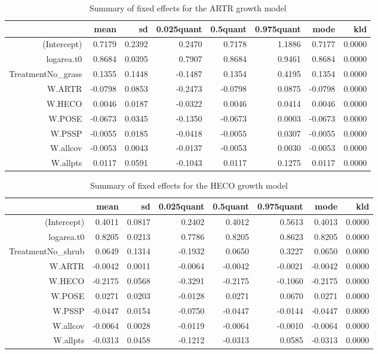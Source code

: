 \begin{table}[ht]
\centering
\caption{Summary of fixed effects for the ARTR growth model} 
\label{ARTRgrowth}
\begin{tabular}{rrrrrrrr}
  \hline
 & mean & sd & 0.025quant & 0.5quant & 0.975quant & mode & kld \\ 
  \hline
(Intercept) & 0.7179 & 0.2392 & 0.2470 & 0.7178 & 1.1886 & 0.7177 & 0.0000 \\ 
  logarea.t0 & 0.8684 & 0.0395 & 0.7907 & 0.8684 & 0.9461 & 0.8684 & 0.0000 \\ 
  TreatmentNo\_grass & 0.1355 & 0.1448 & -0.1487 & 0.1354 & 0.4195 & 0.1354 & 0.0000 \\ 
  W.ARTR & -0.0798 & 0.0853 & -0.2473 & -0.0798 & 0.0875 & -0.0798 & 0.0000 \\ 
  W.HECO & 0.0046 & 0.0187 & -0.0322 & 0.0046 & 0.0414 & 0.0046 & 0.0000 \\ 
  W.POSE & -0.0673 & 0.0345 & -0.1350 & -0.0673 & 0.0003 & -0.0673 & 0.0000 \\ 
  W.PSSP & -0.0055 & 0.0185 & -0.0418 & -0.0055 & 0.0307 & -0.0055 & 0.0000 \\ 
  W.allcov & -0.0053 & 0.0043 & -0.0137 & -0.0053 & 0.0030 & -0.0053 & 0.0000 \\ 
  W.allpts & 0.0117 & 0.0591 & -0.1043 & 0.0117 & 0.1275 & 0.0117 & 0.0000 \\ 
   \hline
\end{tabular}
\end{table}

\begin{table}[ht]
\centering
\caption{Summary of fixed effects for the HECO growth model} 
\label{HECOgrowth}
\begin{tabular}{rrrrrrrr}
  \hline
 & mean & sd & 0.025quant & 0.5quant & 0.975quant & mode & kld \\ 
  \hline
(Intercept) & 0.4011 & 0.0817 & 0.2402 & 0.4012 & 0.5613 & 0.4013 & 0.0000 \\ 
  logarea.t0 & 0.8205 & 0.0213 & 0.7786 & 0.8205 & 0.8623 & 0.8205 & 0.0000 \\ 
  TreatmentNo\_shrub & 0.0649 & 0.1314 & -0.1932 & 0.0650 & 0.3227 & 0.0650 & 0.0000 \\ 
  W.ARTR & -0.0042 & 0.0011 & -0.0064 & -0.0042 & -0.0021 & -0.0042 & 0.0000 \\ 
  W.HECO & -0.2175 & 0.0568 & -0.3291 & -0.2175 & -0.1060 & -0.2175 & 0.0000 \\ 
  W.POSE & 0.0271 & 0.0203 & -0.0128 & 0.0271 & 0.0670 & 0.0271 & 0.0000 \\ 
  W.PSSP & -0.0447 & 0.0154 & -0.0750 & -0.0447 & -0.0144 & -0.0447 & 0.0000 \\ 
  W.allcov & -0.0064 & 0.0028 & -0.0119 & -0.0064 & -0.0010 & -0.0064 & 0.0000 \\ 
  W.allpts & -0.0313 & 0.0458 & -0.1212 & -0.0313 & 0.0585 & -0.0313 & 0.0000 \\ 
   \hline
\end{tabular}
\end{table}

